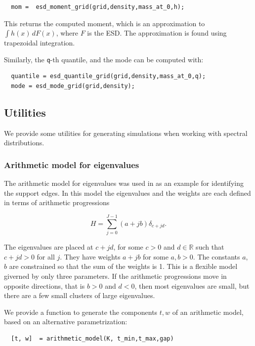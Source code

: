 \documentclass[english,11pt]{article} %
\begin{document}
\begin{verbatim}
  mom =  esd_moment_grid(grid,density,mass_at_0,h);
\end{verbatim}

This returns the computed moment, which is an approximation to $\int h(x)\, dF(x)$, where $F$ is the ESD. The approximation is found using trapezoidal integration.

Similarly, the \verb+q+-th quantile, and the mode can be computed with: 

\begin{verbatim}
  quantile = esd_quantile_grid(grid,density,mass_at_0,q);
  mode = esd_mode_grid(grid,density);
\end{verbatim}

\subsection{Utilities}

We provide some utilities for generating simulations  when working with spectral distributions. 

\subsubsection{Arithmetic model for eigenvalues}

The arithmetic model for eigenvalues was used in \cite{dobriban2015precise} as an example for identifying the support edges. In this model the eigenvalues and the weights are each defined in terms of arithmetic progressions

\begin{equation*}
\label{arithmetic_model}
H = \sum_{j=0}^{J-1} (a + jb) \delta_{c+jd}.
\end{equation*}


The eigenvalues are placed at $c+jd$, for some $c>0$ and $d \in \mathbb{R}$ such that $c+jd>0$ for all $j$. They have weights $a + jb$ for some $a,b>0$. The constants $a$, $b$ are constrained so that the sum of the weights is 1. This is a flexible model giverned by only three parameters. If the arithmetic progressions move in opposite directions, that is $b>0$ and $d<0$, then most eigenvalues are small, but there are a few small clusters of large eigenvalues.

We provide a function to generate the components $t,w$ of an arithmetic model, based on an alternative parametrization:

\begin{verbatim}
  [t, w]  = arithmetic_model(K, t_min,t_max,gap)
\end{verbatim}
\end{document}
